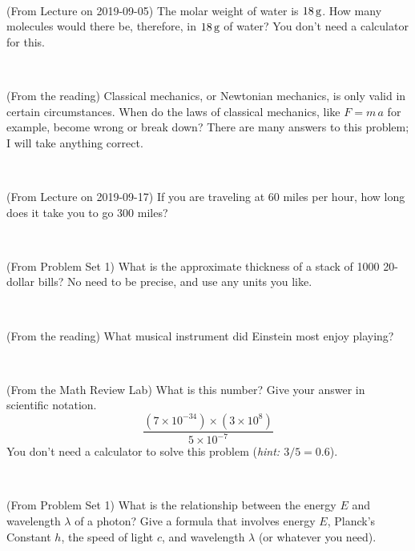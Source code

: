 \documentclass[12pt, letterpaper]{article}
\begin{document}
\vfill ~

\begin{problem} (From Lecture on 2019-09-05)
The molar weight of water is $18\,\mathrm{g}$. How many molecules would there
be, therefore, in $18\,\mathrm{g}$ of water? You don't need a calculator for
this.
\end{problem}


\vfill ~

\begin{problem} (From the reading)
Classical mechanics, or Newtonian mechanics, is only valid in certain
circumstances. When do the laws of classical mechanics, like $F =
m\,a$ for example, become wrong or break down? There are many answers
to this problem; I will take anything correct.
\end{problem}


\vfill ~

\begin{problem} (From Lecture on 2019-09-17)
If you are traveling at 60 miles per hour, how long does
it take you to go 300 miles?
\end{problem}


\vfill ~


\clearpage


\begin{problem} (From Problem Set 1)
What is the approximate thickness of a stack of 1000 20-dollar bills?
No need to be precise, and use any units you like.
\end{problem}


\vfill ~

\begin{problem} (From the reading)
What musical instrument did Einstein most enjoy playing?
\end{problem}


\vfill ~

\begin{problem} (From the Math Review Lab)
What is this number? Give your answer in scientific notation.
$$
\frac{(7\times10^{-34})\times(3\times10^8)}{5\times10^{-7}}
$$
You don't need a calculator to solve this problem (\textit{hint: $3/5=0.6$}).
\end{problem}


\vfill ~

\begin{problem} (From Problem Set 1)
What is the relationship between the energy $E$ and wavelength
$\lambda$ of a photon? Give a formula that involves energy $E$,
Planck's Constant $h$, the speed of light $c$, and wavelength
$\lambda$ (or whatever you need).
\end{problem}
\end{document}

